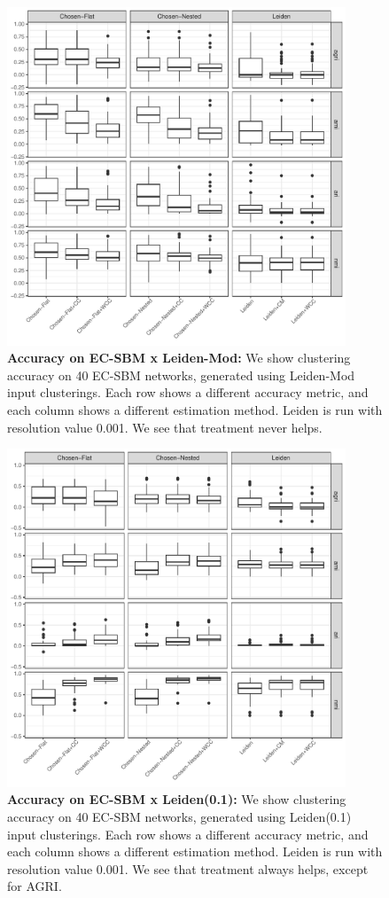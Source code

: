 \documentclass[aps,pre,superscriptaddress]{article}
\begin{document}
\begin{figure}[!htpb]
    \centering
    \includegraphics[width=0.9\textwidth]{figures/estimated_accuracy_leidenmod.pdf}
    \caption[]{\textbf{Accuracy on EC-SBM x Leiden-Mod:} We show clustering accuracy on 40 EC-SBM networks, generated using Leiden-Mod input clusterings. Each row shows a different accuracy metric, and each column shows a different estimation method. Leiden is run with resolution value 0.001. We see that treatment never helps. }
\end{figure}

\begin{figure}[!htpb]
    \centering
    \includegraphics[width=0.9\textwidth]{figures/estimated_accuracy_leiden1.pdf}
    \caption[]{\textbf{Accuracy on EC-SBM x Leiden(0.1):} We show clustering accuracy on 40 EC-SBM networks, generated using Leiden(0.1) input clusterings. Each row shows a different accuracy metric, and each column shows a different estimation method. Leiden is run with resolution value 0.001. We see that treatment always helps, except for AGRI. }
\end{figure}
\end{document}
